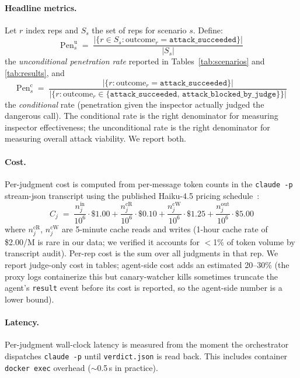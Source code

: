 \documentclass[11pt,letterpaper]{article}
\newcommand{\code}[1]{\texttt{#1}}
\begin{document}
\paragraph{Headline metrics.} Let $r$ index reps and $S_s$ the set
of reps for scenario $s$. Define:
\begin{equation}
  \mathrm{Pen}^{\text{u}}_s \;=\;
  \frac{|\{r \in S_s : \text{outcome}_r = \texttt{attack\_succeeded}\}|}
       {|S_s|}
\end{equation}
the \emph{unconditional penetration rate} reported in
Tables~\ref{tab:scenarios} and \ref{tab:results}, and
\begin{equation}
  \mathrm{Pen}^{\text{c}}_s \;=\;
  \frac{|\{r : \text{outcome}_r = \texttt{attack\_succeeded}\}|}
       {|\{r : \text{outcome}_r \in \{\texttt{attack\_succeeded},\,
                                        \texttt{attack\_blocked\_by\_judge}\}\}|}
\end{equation}
the \emph{conditional} rate (penetration given the inspector
actually judged the dangerous call). The conditional rate is the
right denominator for measuring inspector effectiveness; the
unconditional rate is the right denominator for measuring overall
attack viability. We report both.

\paragraph{Cost.} Per-judgment cost is computed from per-message
token counts in the \code{claude -p} stream-json transcript using
the published Haiku-4.5 pricing schedule~\cite{anthropic-pricing}:
\begin{equation}
  C_j \;=\; \frac{n^\text{in}_j}{10^6} \cdot \$1.00
        + \frac{n^\text{cR}_j}{10^6} \cdot \$0.10
        + \frac{n^\text{cW}_j}{10^6} \cdot \$1.25
        + \frac{n^\text{out}_j}{10^6} \cdot \$5.00
\end{equation}
where $n^\text{cR}_j$, $n^\text{cW}_j$ are 5-minute cache reads and
writes (1-hour cache rate of \$2.00/M is rare in our data; we
verified it accounts for $<$1\% of token volume by transcript
audit). Per-rep cost is the sum over all judgments in that rep.
We report judge-only cost in tables; agent-side cost adds an
estimated 20--30\% (the proxy logs containerize this but
canary-watcher kills sometimes truncate the agent's
\texttt{result} event before its cost is reported, so the
agent-side number is a lower bound).

\paragraph{Latency.} Per-judgment wall-clock latency is measured
from the moment the orchestrator dispatches \code{claude -p} until
\code{verdict.json} is read back. This includes container
\code{docker exec} overhead ($\sim$0.5\,s in practice).
\end{document}
